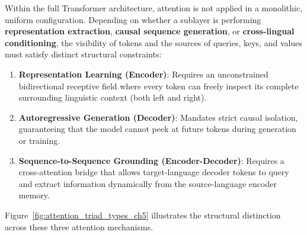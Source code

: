 \documentclass[../../../main.tex]{subfiles}
\begin{document}
Within the full Transformer architecture, attention is not applied in a monolithic, uniform configuration. Depending on whether a sublayer is performing \textbf{representation extraction}, \textbf{causal sequence generation}, or \textbf{cross-lingual conditioning}, the visibility of tokens and the sources of queries, keys, and values must satisfy distinct structural constraints:
\begin{enumerate}
    \item \textbf{Representation Learning (Encoder)}: Requires an unconstrained bidirectional receptive field where every token can freely inspect its complete surrounding linguistic context (both left and right).
    \item \textbf{Autoregressive Generation (Decoder)}: Mandates strict causal isolation, guaranteeing that the model cannot peek at future tokens during generation or training.
    \item \textbf{Sequence-to-Sequence Grounding (Encoder-Decoder)}: Requires a cross-attention bridge that allows target-language decoder tokens to query and extract information dynamically from the source-language encoder memory.
\end{enumerate}

Figure~\ref{fig:attention_triad_types_ch5} illustrates the structural distinction across these three attention mechanisms.
\end{document}
